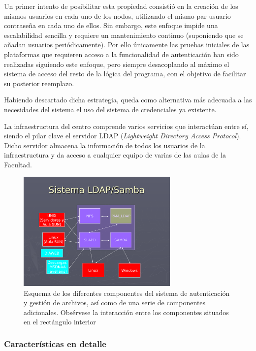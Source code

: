 Un primer intento de posibilitar esta propiedad consistió en la creación de los mismos usuarios en cada uno de los nodos, utilizando el mismo par usuario-contraseña en cada uno de ellos. Sin embargo, este enfoque impide una escalabilidad sencilla y requiere un mantenimiento continuo (suponiendo que se añadan usuarios periódicamente). Por ello únicamente las pruebas iniciales de las plataformas que requieren acceso a la funcionalidad de autenticación han sido realizadas siguiendo este enfoque, pero siempre desacoplando al máximo el sistema de acceso del resto de la lógica del programa, con el objetivo de facilitar su posterior reemplazo.

Habiendo descartado dicha estrategia, queda como alternativa más adecuada a las necesidades del sistema el uso del sistema de credenciales ya existente.

La infraestructura del centro comprende varios servicios que interactúan entre sí, siendo el pilar clave el servidor LDAP (\textit{Lightweight Directory Access Protocol}). Dicho servidor almacena la información de todos los usuarios de la infraestructura y da acceso a cualquier equipo de varias de las aulas de la Facultad.

\begin{figure}[H]
	\centering
	\includegraphics[width=0.7\textwidth]{Chapter5/Figures/LDAP.pdf}
	\caption[Esquema de los componentes del sistema de autenticación y gestión de archivos]{Esquema de los diferentes componentes del sistema de autenticación y gestión de archivos, así como de una serie de componentes adicionales. Obsérvese la interacción entre los componentes situados en el rectángulo interior}
	\label{fig:arquitectura_ldap}
\end{figure}

\subsubsection{Características en detalle}

